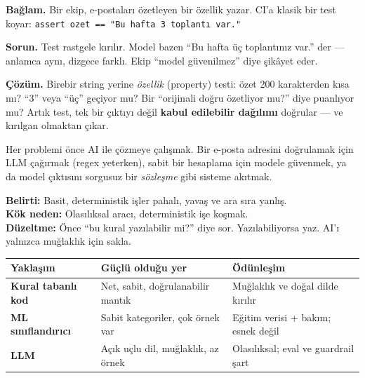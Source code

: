 
\begin{prodbox}
\textbf{Bağlam.} Bir ekip, e-postaları özetleyen bir özellik yazar. CI'a klasik
bir test koyar: \texttt{assert ozet == "Bu hafta 3 toplantı var."}

\smallskip
\textbf{Sorun.} Test rastgele kırılır. Model bazen ``Bu hafta üç toplantınız
var.'' der --- anlamca aynı, dizgece farklı. Ekip ``model güvenilmez'' diye
şikâyet eder.

\smallskip
\textbf{Çözüm.} Birebir string yerine \emph{özellik} (property) testi: özet 200
karakterden kısa mı? ``3'' veya ``üç'' geçiyor mu? Bir 
``orijinali doğru özetliyor mu?'' diye puanlıyor mu? Artık test, tek bir çıktıyı
değil \textbf{kabul edilebilir dağılımı} doğrular --- ve kırılgan olmaktan çıkar.
\end{prodbox}

\begin{antibox}
Her problemi önce AI ile çözmeye çalışmak. Bir e-posta adresini doğrulamak için
LLM çağırmak (regex yeterken), sabit bir hesaplama için modele güvenmek, ya da
model çıktısını sorgusuz bir \emph{sözleşme} gibi sisteme akıtmak.

\smallskip
\textbf{Belirti:} Basit, deterministik işler pahalı, yavaş ve ara sıra yanlış.\\
\textbf{Kök neden:} Olasılıksal aracı, deterministik işe koşmak.\\
\textbf{Düzeltme:} Önce ``bu kural yazılabilir mi?'' diye sor. Yazılabiliyorsa yaz. AI'ı yalnızca muğlaklık için sakla.
\end{antibox}

\vspace{2pt}
\begin{tabularx}{\linewidth}{@{}>{\raggedright\arraybackslash}p{30mm} L L@{}}
\toprule
{\sffamily\bfseries\small Yaklaşım} &
{\sffamily\bfseries\small Güçlü olduğu yer} &
{\sffamily\bfseries\small Ödünleşim} \\
\midrule
\textbf{Kural tabanlı kod} & Net, sabit, doğrulanabilir mantık &
Muğlaklık ve doğal dilde kırılır \\
\addlinespace[3pt]
\textbf{ML sınıflandırıcı} & Sabit kategoriler, çok örnek var &
Eğitim verisi + bakım; esnek değil \\
\addlinespace[3pt]
\textbf{LLM} & Açık uçlu dil, muğlaklık, az örnek &
Olasılıksal; eval ve guardrail şart \\
\bottomrule
\end{tabularx}


